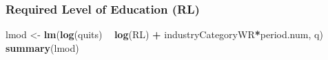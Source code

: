 \documentclass[
]{article}
\newenvironment{Shaded}{\begin{snugshade}}{\end{snugshade}}
\newcommand{\KeywordTok}[1]{\textcolor[rgb]{0.13,0.29,0.53}{\textbf{#1}}}
\newcommand{\NormalTok}[1]{#1}
\newcommand{\OperatorTok}[1]{\textcolor[rgb]{0.81,0.36,0.00}{\textbf{#1}}}
\newcommand{\StringTok}[1]{\textcolor[rgb]{0.31,0.60,0.02}{#1}}
\begin{document}
\hypertarget{required-level-of-education-rl-2}{%
\subsubsection{Required Level of Education
(RL)}\label{required-level-of-education-rl-2}}

\begin{Shaded}
\begin{Highlighting}[]
\NormalTok{lmod <-}\StringTok{ }\KeywordTok{lm}\NormalTok{(}\KeywordTok{log}\NormalTok{(quits) }\OperatorTok{~}\StringTok{ }\KeywordTok{log}\NormalTok{(RL) }\OperatorTok{+}\StringTok{ }\NormalTok{industryCategoryWR}\OperatorTok{*}\NormalTok{period.num, q)}
\KeywordTok{summary}\NormalTok{(lmod)}
\end{Highlighting}
\end{Shaded}
\end{document}
